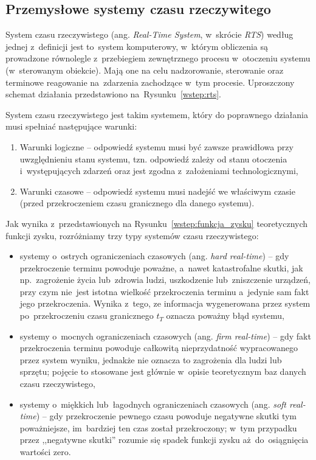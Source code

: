 \subsection{Przemysłowe systemy czasu rzeczywitego}
System czasu rzeczywistego (ang. \textit{Real-Time System}, w~skrócie \textit{RTS}) według jednej z~definicji jest to~system komputerowy, w~którym obliczenia są prowadzone równolegle z~przebiegiem zewnętrznego procesu w~otoczeniu systemu (w~sterowanym obiekcie). Mają one na celu nadzorowanie, sterowanie oraz terminowe reagowanie na~zdarzenia zachodzące w~tym procesie. Uproszczony schemat działania przedstawiono na~Rysunku~\ref{wstep:rts}.
\vspace{-3mm}

System czasu rzeczywistego jest takim systemem, który do poprawnego działania musi spełniać następujące warunki:
\begin{enumerate}
\item Warunki logiczne -- odpowiedź systemu musi być zawsze prawidłowa przy uwzględnieniu stanu systemu, tzn. odpowiedź zależy od stanu otoczenia i~występujących zdarzeń oraz jest zgodna z~założeniami technologicznymi,
\item Warunki czasowe -- odpowiedź systemu musi nadejść we właściwym czasie (przed przekroczeniem czasu granicznego dla danego systemu).
\end{enumerate}


Jak wynika z~przedstawionych na Rysunku~\ref{wstep:funkcja_zysku} teoretycznych funkcji zysku, rozróżniamy trzy typy systemów czasu rzeczywistego:
\begin{itemize}
\item systemy o~ostrych ograniczeniach czasowych (ang. \textit{hard real-time}) -- gdy przekroczenie terminu powoduje poważne, a~nawet katastrofalne skutki, jak np.~zagrożenie życia lub~zdrowia ludzi, uszkodzenie lub~zniszczenie urządzeń, przy czym nie~jest istotna wielkość przekroczenia terminu a~jedynie sam fakt jego przekroczenia. Wynika z~tego, ze informacja wygenerowana przez system po~przekroczeniu czasu granicznego $t_T$ oznacza poważny błąd systemu,

\item systemy o~mocnych ograniczeniach czasowych (ang. \textit{firm real-time}) -- gdy fakt przekroczenia terminu powoduje całkowitą nieprzydatność wypracowanego przez system wyniku, jednakże nie oznacza to zagrożenia dla ludzi lub sprzętu; pojęcie to stosowane jest głównie w~opisie teoretycznym baz danych czasu rzeczywistego,

\item systemy o~miękkich lub~łagodnych ograniczeniach czasowych (ang. \textit{soft real-time}) -- gdy przekroczenie pewnego czasu powoduje negatywne skutki tym poważniejsze, im~bardziej ten czas został przekroczony; w~tym przypadku przez ,,negatywne skutki'' rozumie się spadek funkcji zysku aż~do~osiągnięcia wartości zero.
\end{itemize}

